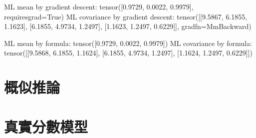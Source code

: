 \documentclass[letterpaper,10pt,english]{sphinxmanual}
\begin{document}
\begin{sphinxVerbatim}[commandchars=\\\{\}]
ML mean by gradient descent: 
 tensor([\PYGZhy{}0.9729, \PYGZhy{}0.0022,  0.9979], requires\PYGZus{}grad=True)
ML covariance by gradient descent: 
 tensor([[9.5867, 6.1855, 1.1623],
        [6.1855, 4.9734, 1.2497],
        [1.1623, 1.2497, 0.6229]], grad\PYGZus{}fn=\PYGZlt{}MmBackward\PYGZgt{})
\end{sphinxVerbatim}

\begin{sphinxVerbatim}[commandchars=\\\{\}]
     
        
     
\end{sphinxVerbatim}

\begin{sphinxVerbatim}[commandchars=\\\{\}]
ML mean by formula: 
 tensor([\PYGZhy{}0.9729, \PYGZhy{}0.0022,  0.9979])
ML covariance by formula: 
 tensor([[9.5868, 6.1855, 1.1624],
        [6.1855, 4.9734, 1.2497],
        [1.1624, 1.2497, 0.6229]])
\end{sphinxVerbatim}


\chapter{概似推論}
\label{\detokenize{notebook/likelihood-inference:id1}}\label{\detokenize{notebook/likelihood-inference::doc}}

\chapter{真實分數模型}
\label{\detokenize{notebook/true-score-model:id1}}\label{\detokenize{notebook/true-score-model::doc}}
\end{document}
